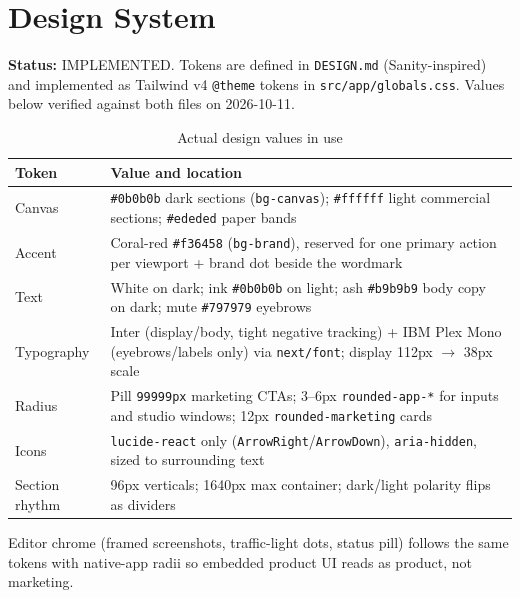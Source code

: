 \section{Design System}
\label{sec:design-system}

\textbf{Status:} IMPLEMENTED. Tokens are defined in \texttt{DESIGN.md} (Sanity-inspired) and implemented as Tailwind v4 \texttt{@theme} tokens in \texttt{src/app/globals.css}. Values below verified against both files on 2026-10-11.

\begin{table}[H]
\centering
\caption{Actual design values in use}
\begin{tabular}{|l|p{8.5cm}|}
\hline
\textbf{Token} & \textbf{Value and location} \\ \hline
Canvas & \texttt{\#0b0b0b} dark sections (\texttt{bg-canvas}); \texttt{\#ffffff} light commercial sections; \texttt{\#ededed} paper bands \\ \hline
Accent & Coral-red \texttt{\#f36458} (\texttt{bg-brand}), reserved for one primary action per viewport + brand dot beside the wordmark \\ \hline
Text & White on dark; ink \texttt{\#0b0b0b} on light; ash \texttt{\#b9b9b9} body copy on dark; mute \texttt{\#797979} eyebrows \\ \hline
Typography & Inter (display/body, tight negative tracking) + IBM Plex Mono (eyebrows/labels only) via \texttt{next/font}; display 112px $\rightarrow$ 38px scale \\ \hline
Radius & Pill \texttt{99999px} marketing CTAs; 3--6px \texttt{rounded-app-*} for inputs and studio windows; 12px \texttt{rounded-marketing} cards \\ \hline
Icons & \texttt{lucide-react} only (\texttt{ArrowRight}/\texttt{ArrowDown}), \texttt{aria-hidden}, sized to surrounding text \\ \hline
Section rhythm & 96px verticals; 1640px max container; dark/light polarity flips as dividers \\ \hline
\end{tabular}
\end{table}

Editor chrome (framed screenshots, traffic-light dots, status pill) follows the same tokens with native-app radii so embedded product UI reads as product, not marketing.
